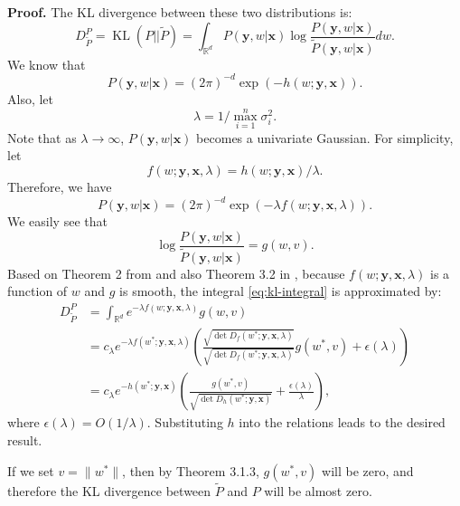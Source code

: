 \documentclass[12pt]{article}
\DeclareMathOperator{\KL}{KL}
\DeclareMathOperator{\det}{det}
\begin{document}
	\textbf{Proof.} The KL divergence between these two distributions is:
	\begin{equation}
		D_{\tilde{P}}^P = \KL(P||\tilde{P}) = \int_{\mathbb{R}^d} P(\mathbf{y}, w|\mathbf{x}) \log \frac{P(\mathbf{y}, w|\mathbf{x})}{\tilde{P}(\mathbf{y}, w|\mathbf{x})} dw.
	\end{equation}
	We know that
	\begin{equation}
		P(\mathbf{y}, w|\mathbf{x}) = (2\pi)^{-d} \exp(- h(w; \mathbf{y}, \mathbf{x})).
	\end{equation}
	Also, let
	\begin{equation}
		\lambda = 1 / \max_{i=1}^{n} \sigma_i^2.
	\end{equation}
	Note that as $\lambda \to \infty$, $P(\mathbf{y}, w|\mathbf{x})$ becomes a univariate Gaussian. For simplicity, let
	\begin{equation}
		f(w; \mathbf{y}, \mathbf{x}, \lambda) = h(w; \mathbf{y}, \mathbf{x}) / \lambda.
	\end{equation}
	Therefore, we have
	\begin{equation}
		P(\mathbf{y}, w|\mathbf{x}) = (2\pi)^{-d} \exp(-\lambda f(w; \mathbf{y}, \mathbf{x}, \lambda)).
	\end{equation}
	We easily see that
	\begin{equation}
		\log \frac{P(\mathbf{y}, w|\mathbf{x})}{\tilde{P}(\mathbf{y}, w|\mathbf{x})} = g(w, v).
	\end{equation}
	Based on Theorem 2 from \cite{wong2001laplace} and also Theorem 3.2 in \cite{shun1995approximate}, because $f(w; \mathbf{y}, \mathbf{x}, \lambda)$ is a function of $w$ and $g$ is smooth, the integral \eqref{eq:kl-integral} is approximated by:
	\begin{align}
		D_{\tilde{P}}^P &= \int_{\mathbb{R}^d} e^{-\lambda f(w; \mathbf{y}, \mathbf{x}, \lambda)} g(w, v) \\
		&= c_\lambda e^{-\lambda f(w^*; \mathbf{y}, \mathbf{x}, \lambda)} \left( \frac{\sqrt{\det D_f(w^*; \mathbf{y}, \mathbf{x}, \lambda)}}{\sqrt{\det D_f(w^*; \mathbf{y}, \mathbf{x}, \lambda)}} g(w^*, v) + \epsilon(\lambda) \right) \\
		&= c_\lambda e^{-h(w^*; \mathbf{y}, \mathbf{x})} \left( \frac{g(w^*, v)}{\sqrt{\det D_h(w^*; \mathbf{y}, \mathbf{x})}} + \frac{\epsilon(\lambda)}{\lambda} \right),
	\end{align}
	where $\epsilon(\lambda) = O(1/\lambda)$. Substituting $h$ into the relations leads to the desired result.
	
	If we set $v = \|w^*\|$, then by Theorem 3.1.3, $g(w^*, v)$ will be zero, and therefore the KL divergence between $\tilde{P}$ and $P$ will be almost zero.
	
\end{document}
